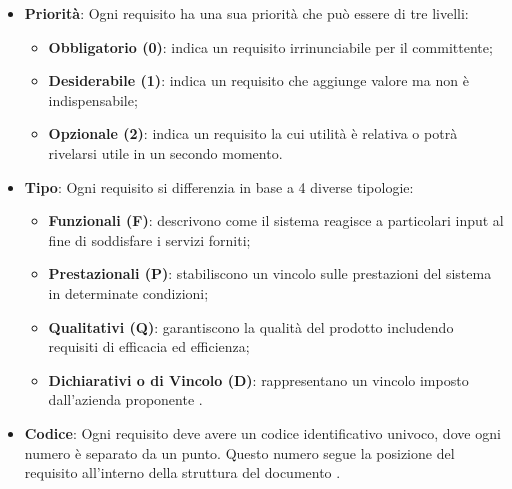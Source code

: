 \begin{itemize}
    \item \textbf{Priorità}: Ogni requisito ha una sua priorità che può essere di tre livelli:
    \begin{itemize}
        \item \textbf{Obbligatorio (0)}: indica un requisito irrinunciabile per il committente;
        \item \textbf{Desiderabile (1)}: indica un requisito che aggiunge valore ma non è indispensabile;
        \item \textbf{Opzionale (2)}: indica un requisito la cui utilità è relativa o potrà rivelarsi utile in un secondo momento.
    \end{itemize}



    \item \textbf{Tipo}: Ogni requisito si differenzia in base a 4 diverse tipologie:
        \begin{itemize}
            \item \textbf{Funzionali (F)}: descrivono come il sistema reagisce a particolari input al fine di soddisfare i servizi forniti;
            \item \textbf{Prestazionali (P)}: stabiliscono un vincolo sulle prestazioni del sistema in determinate condizioni;
            \item \textbf{Qualitativi (Q)}: garantiscono la qualità del prodotto includendo requisiti di efficacia ed efficienza;
            \item \textbf{Dichiarativi o di Vincolo (D)}: rappresentano un vincolo imposto dall'azienda proponente \proposerName{}.
        \end{itemize}

    \item \textbf{Codice}: Ogni requisito deve avere un codice identificativo univoco, dove ogni numero è separato da un punto.
Questo numero segue la posizione del requisito all'interno della struttura del documento .

\end{itemize}

